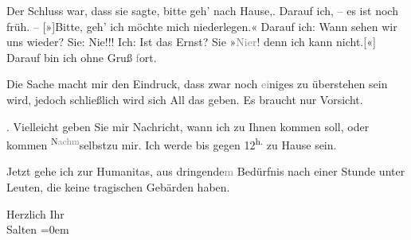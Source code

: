 \pstart
           Der Schluss war, dass sie
               sagte, bitte geh’ nach Hause,. Darauf ich, – es ist noch früh. –
                  {[}»{]}Bitte, geh’ ich möchte mich niederlegen.« Darauf ich: Wann
               sehen wir uns wieder? Sie:
               Nie!!! Ich: Ist das Ernst? Sie »\textcolor{gray}{Ni{\geminationm}er}! {\pb}denn ich kann
                  nicht.{[}«{]} Darauf bin ich ohne Gruß \textcolor{gray}{f}ort.\pend
           
\pstart
           Die Sache macht mir den Eindruck, dass zwar noch \textcolor{gray}{ei}niges zu
               überstehen sein wird, jedoch schließlich wird sich All das geben. Es braucht nur
               Vorsicht.\pend
           
\pstart
           \label{K_L03149-2v}\label{K_L03149-2}. Vielleicht geben Sie mir Nachricht, wann ich zu Ihnen kommen soll, oder
               kommen \substVorne{}\textsuperscript{N\textcolor{gray}{achm}}\substDazwischen{}selbst\substHinten{}{ }{\pb}zu mir. Ich werde bis gegen
                     12\textsuperscript{h.}{ }zu Hause sein.\pend
           
\pstart
           Jetzt gehe ich zur Humanitas, aus
                  dringende\textcolor{gray}{m} Bedürfnis nach einer Stunde unter Leuten, die keine
               tragischen Gebärden haben.\pend
           
\pstart
           Herzlich Ihr {\\[\baselineskip]}\spacefill\mbox{Salten}\pend
           \leftskip=0em{}\endnumbering{}  
      